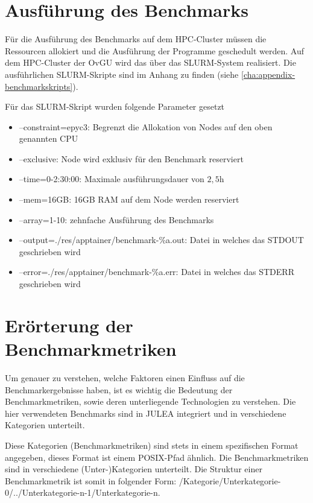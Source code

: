 \section{Ausführung des Benchmarks} \label{sec:benchmark-execution}

Für die Ausführung des Benchmarks auf dem HPC-Cluster müssen die Ressourcen allokiert und die Ausführung der Programme geschedult werden. Auf dem HPC-Cluster der OvGU wird das über das SLURM-System realisiert. Die ausführlichen SLURM-Skripte sind im Anhang zu finden (siehe \cref{cha:appendix-benchmarkskripts}).

Für das SLURM-Skript wurden folgende Parameter gesetzt

\begin{itemize}
    \item --constraint=epyc3: Begrenzt die Allokation von Nodes auf den oben genannten CPU
    \item --exclusive: Node wird exklusiv für den Benchmark reserviert
    \item --time=0-2:30:00: Maximale ausführungsdauer von $2,5\text{h}$
    \item --mem=16GB: 16GB RAM auf dem Node werden reserviert
    \item --array=1-10: zehnfache Ausführung des Benchmarks
    \item --output=./res/apptainer/benchmark-\%a.out: Datei in welches das STDOUT geschrieben wird
    \item --error=./res/apptainer/benchmark-\%a.err: Datei in welches das STDERR geschrieben wird 
\end{itemize}

\section{Erörterung der Benchmarkmetriken}

Um genauer zu verstehen, welche Faktoren einen Einfluss auf die Benchmarkergebnisse haben, ist es wichtig die Bedeutung der Benchmarkmetriken, sowie deren unterliegende Technologien zu verstehen. 
Die hier verwendeten Benchmarks sind in JULEA integriert und in verschiedene Kategorien unterteilt.

Diese Kategorien (Benchmarkmetriken) sind stets in einem spezifischen Format angegeben, dieses Format ist einem POSIX-Pfad ähnlich. Die Benchmarkmetriken sind in verschiedene (Unter-)Kategorien unterteilt. Die Struktur einer Benchmarkmetrik ist somit in folgender Form: /Kategorie/Unterkategorie-0/../Unterkategorie-n-1/Unterkategorie-n.


